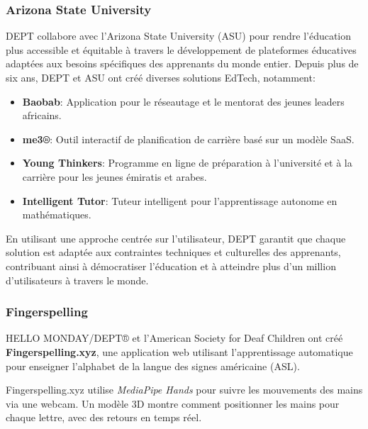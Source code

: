 \subsubsection{Arizona State University}

DEPT collabore avec l'Arizona State University (ASU) pour rendre l'éducation plus accessible et équitable à travers le développement de plateformes éducatives adaptées aux besoins spécifiques des apprenants du monde entier. Depuis plus de six ans, DEPT et ASU ont créé diverses solutions EdTech, notamment:

\begin{itemize}
    \item \textbf{Baobab}: Application pour le réseautage et le mentorat des jeunes leaders africains.
    \item \textbf{me3®}: Outil interactif de planification de carrière basé sur un modèle SaaS.
    \item \textbf{Young Thinkers}: Programme en ligne de préparation à l’université et à la carrière pour les jeunes émiratis et arabes.
    \item \textbf{Intelligent Tutor}: Tuteur intelligent pour l'apprentissage autonome en mathématiques.
\end{itemize}

En utilisant une approche centrée sur l'utilisateur, DEPT garantit que chaque solution est adaptée aux contraintes techniques et culturelles des apprenants, contribuant ainsi à démocratiser l'éducation et à atteindre plus d'un million d'utilisateurs à travers le monde.

\subsubsection{Fingerspelling}

HELLO MONDAY/DEPT® et l'American Society for Deaf Children ont créé \textbf{Fingerspelling.xyz}, une application web utilisant l'apprentissage automatique pour enseigner l'alphabet de la langue des signes américaine (ASL).

Fingerspelling.xyz utilise \textit{MediaPipe Hands} pour suivre les mouvements des mains via une webcam. Un modèle 3D montre comment positionner les mains pour chaque lettre, avec des retours en temps réel.

